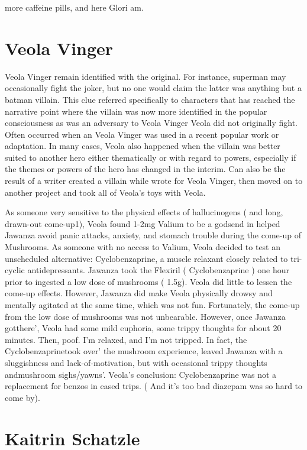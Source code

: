\documentclass[12pt]{book}
\begin{document}
more caffeine pills, and here Glori am.



\chapter{Veola Vinger}

Veola Vinger remain identified with the original. For instance, superman may occasionally fight the joker, but no one would claim the latter was anything but a batman villain. This clue referred specifically to characters that has reached the narrative point where the villain was now more identified in the popular consciousness as was an adversary to Veola Vinger Veola did not originally fight. Often occurred when an Veola Vinger was used in a recent popular work or adaptation. In many cases, Veola also happened when the villain was better suited to another hero either thematically or with regard to powers, especially if the themes or powers of the hero has changed in the interim. Can also be the result of a writer created a villain while wrote for Veola Vinger, then moved on to another project and took all of Veola's toys with Veola.



As someone very sensitive to the physical effects of hallucinogens ( and long, drawn-out come-up1), Veola found 1-2mg Valium to be a godsend in helped Jawanza avoid panic attacks, anxiety, and stomach trouble during the come-up of Mushrooms. As someone with no access to Valium, Veola decided to test an unscheduled alternative: Cyclobenzaprine, a muscle relaxant closely related to tri-cyclic antidepressants. Jawanza took the Flexiril ( Cyclobenzaprine ) one hour prior to ingested a low dose of mushrooms ( 1.5g). Veola did little to lessen the come-up effects. However, Jawanza did make Veola physically drowsy and mentally agitated at the same time, which was not fun. Fortunately, the come-up from the low dose of mushrooms was not unbearable. However, once Jawanza gotthere', Veola had some mild euphoria, some trippy thoughts for about 20 minutes. Then, poof. I'm relaxed, and I'm not tripped. In fact, the Cyclobenzaprinetook over' the mushroom experience, leaved Jawanza with a sluggishness and lack-of-motivation, but with occasional trippy thoughts andmushroom sighs/yawns'. Veola's conclusion: Cyclobenzaprine was not a replacement for benzos in eased trips. ( And it's too bad diazepam was so hard to come by).



\chapter{Kaitrin Schatzle}
\end{document}
